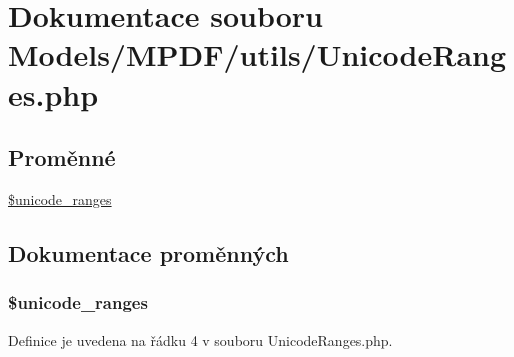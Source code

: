 \hypertarget{_unicode_ranges_8php}{\section{Dokumentace souboru Models/\-M\-P\-D\-F/utils/\-Unicode\-Ranges.php}
\label{_unicode_ranges_8php}
}
\subsection*{Proměnné}
\begin{DoxyCompactItemize}
\item 
\hyperlink{_unicode_ranges_8php_a9263143466917a9180f14fb0deea115c}{\$unicode\-\_\-ranges}
\end{DoxyCompactItemize}


\subsection{Dokumentace proměnných}
\hypertarget{_unicode_ranges_8php_a9263143466917a9180f14fb0deea115c}{
\subsubsection[{\$unicode\-\_\-ranges}]{\setlength{\rightskip}{0pt plus 5cm}\$unicode\-\_\-ranges}}\label{_unicode_ranges_8php_a9263143466917a9180f14fb0deea115c}


Definice je uvedena na řádku 4 v souboru Unicode\-Ranges.\-php.

